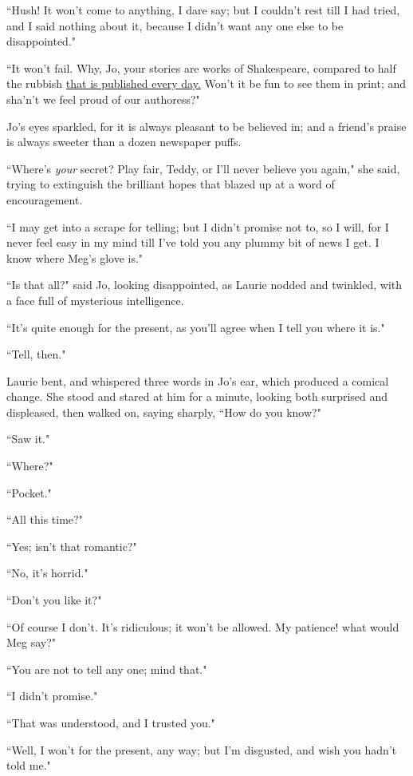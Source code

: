 ``Hush! It won't come to anything, I dare say; but I
couldn't rest till I had tried, and I said nothing about
it, because I didn't want any one else to be
disappointed."

``It won't fail. Why, Jo, your stories are works of
Shakespeare, compared to half the rubbish \underline{that is published every
day.} Won't it be fun to see them in print; and
sha'n't we feel proud of our authoress?"

Jo's eyes sparkled, for it is always pleasant to be
believed in; and a friend's praise is always sweeter
than a dozen newspaper puffs.

``Where's \emph{your} secret? Play fair, Teddy, or
I'll never believe you again," she said, trying to
extinguish the brilliant hopes that blazed up at a word of
encouragement.

``I may get into a scrape for telling; but I didn't
promise not to, so I will, for I never feel easy in my mind till
I've told you any plummy bit of news I get. I know where
Meg's glove is."

``Is that all?" said Jo, looking disappointed, as Laurie nodded and
twinkled, with a face full of mysterious intelligence.

``It's quite enough for the present, as
you'll agree when I tell you where it is."

``Tell, then."

Laurie bent, and whispered three words in Jo's ear,
which produced a comical change. She stood and stared at him for a
minute, looking both surprised and displeased, then walked on, saying
sharply, ``How do you know?"

``Saw it."

``Where?"

``Pocket."

``All this time?"

``Yes; isn't that romantic?"

``No, it's horrid."

``Don't you like it?"

``Of course I don't. It's ridiculous; it
won't be allowed. My patience! what would Meg say?"

``You are not to tell any one; mind that."

``I didn't promise."

``That was understood, and I trusted you."

``Well, I won't for the present, any way; but
I'm disgusted, and wish you hadn't told
me."

